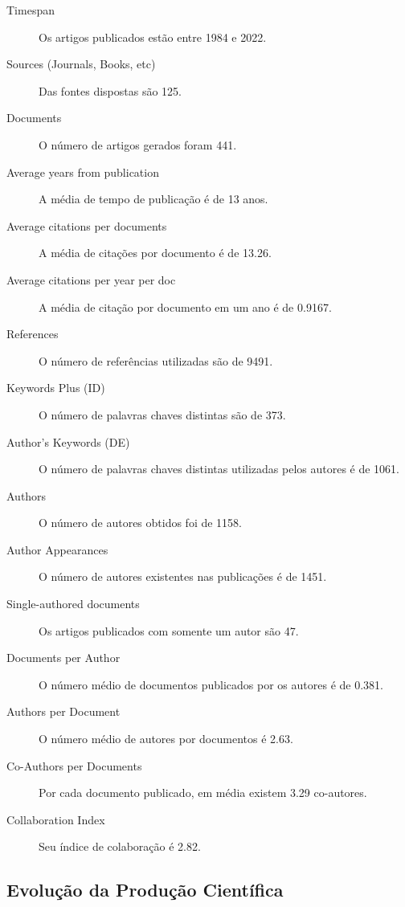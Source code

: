 \begin{description}
    \item[Timespan] Os artigos publicados estão entre 1984 e 2022.
    \item[Sources (Journals, Books, etc)] Das fontes dispostas são 125.
    \item[Documents] O número de artigos gerados foram 441.
    \item[Average years from publication] A média de tempo de publicação é de 13 anos.
    \item[Average citations per documents] A média de citações por documento é de 13.26.
    \item[Average citations per year per doc] A média de citação por documento em um ano é de  0.9167.
    \item[References] O número de referências utilizadas são de 9491.
    \item[Keywords Plus (ID)] O número de palavras chaves distintas são de 373.
    \item[Author's Keywords (DE)] O número de palavras chaves distintas utilizadas pelos autores é de  1061.
    \item[Authors] O número de autores obtidos foi de 1158.
    \item[Author Appearances] O número de autores existentes nas publicações é de 1451.
    \item[Single-authored documents] Os artigos publicados com somente um autor são 47.
    \item[Documents per Author] O número médio de documentos publicados por os autores é de 0.381.
    \item[Authors per Document] O número médio de autores por documentos é 2.63.
    \item[Co-Authors per Documents] Por cada documento publicado, em média existem  3.29 co-autores.
    \item[Collaboration Index] Seu índice de colaboração é 2.82.
\end{description}

\subsection{Evolução da Produção Científica}

